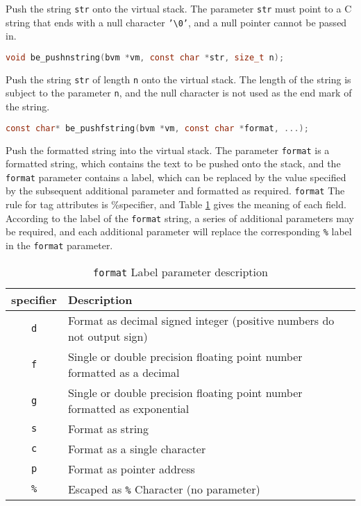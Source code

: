 Push the string \texttt{str} onto the virtual stack. The parameter \texttt{str} must point to a C string that ends with a null character \texttt{'\textbackslash 0'}, and a null pointer cannot be passed in.


\begin{lstlisting}[language=c, style=berry, numbers=none]
void be_pushnstring(bvm *vm, const char *str, size_t n);
\end{lstlisting}Push the string \texttt{str} of length \texttt{n} onto the virtual stack. The length of the string is subject to the parameter \texttt{n}, and the null character is not used as the end mark of the string.


\begin{lstlisting}[language=c, style=berry, numbers=none]
const char* be_pushfstring(bvm *vm, const char *format, ...);
\end{lstlisting}

Push the formatted string into the virtual stack. The parameter \texttt{format} is a formatted string, which contains the text to be pushed onto the stack, and the \texttt{format} parameter contains a label, which can be replaced by the value specified by the subsequent additional parameter and formatted as required. \texttt{format} The rule for tag attributes is \textsf{\%specifier}, and Table \ref{tab::format_specifier} gives the meaning of each field. According to the label of the \texttt{format} string, a series of additional parameters may be required, and each additional parameter will replace the corresponding \texttt{\%} label in the \texttt{format} parameter.
\begin{table}[htb]
    \centering
    \setlength{\tabcolsep}{3mm}
    \begin{tabular}{cll} \toprule
        \textbf{\textsf{specifier}} & \textbf{Description} \\ \midrule
        \texttt{d} & Format as decimal signed integer (positive numbers do not output sign) \\
        \texttt{f} & Single or double precision floating point number formatted as a decimal \\
        \texttt{g} & Single or double precision floating point number formatted as exponential \\
        \texttt{s} & Format as string \\
        \texttt{c} & Format as a single character \\
        \texttt{p} & Format as pointer address \\
        \texttt{\%} & Escaped as \texttt{\%} Character (no parameter) \\
        \bottomrule
    \end{tabular}
    \caption{\texttt{format} Label parameter description}
    \label{tab::format_specifier}
\end{table}

